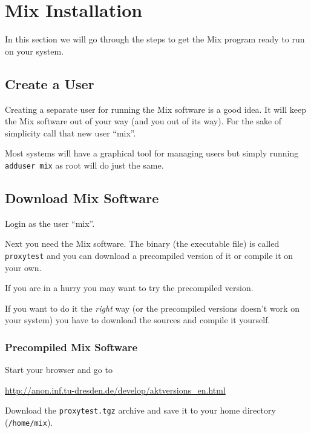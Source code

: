 \documentclass{article}
\begin{document}
\section{Mix Installation}

In this section we will go through the steps to get the Mix program ready
to run on your system. 


\subsection{Create a User}

Creating a separate user for running the Mix software is a good idea.
It will keep the Mix software out of your way (and you out of its
way). For the sake of simplicity call that new user ``mix''.

Most systems will have a graphical tool for managing users but simply
running \verb|adduser mix| as root will do just the same.


\subsection{Download Mix Software}

Login as the user ``mix''.

Next you need the Mix software. The binary (the
executable file) is called \verb|proxytest| and you can download a
precompiled version of it or compile it on your own.

If you are in a hurry you may want to try the precompiled version. 

If you want to do it the \emph{right} way (or the precompiled versions
doesn't work on your system) you have to download the sources and compile it
yourself.


\subsubsection{Precompiled Mix Software}
\label{precompiled}
Start your browser and go to

\url{http://anon.inf.tu-dresden.de/develop/aktversions_en.html}

Download the \verb|proxytest.tgz| archive and save it to your home directory (\texttt{/home/mix}).
\end{document}
